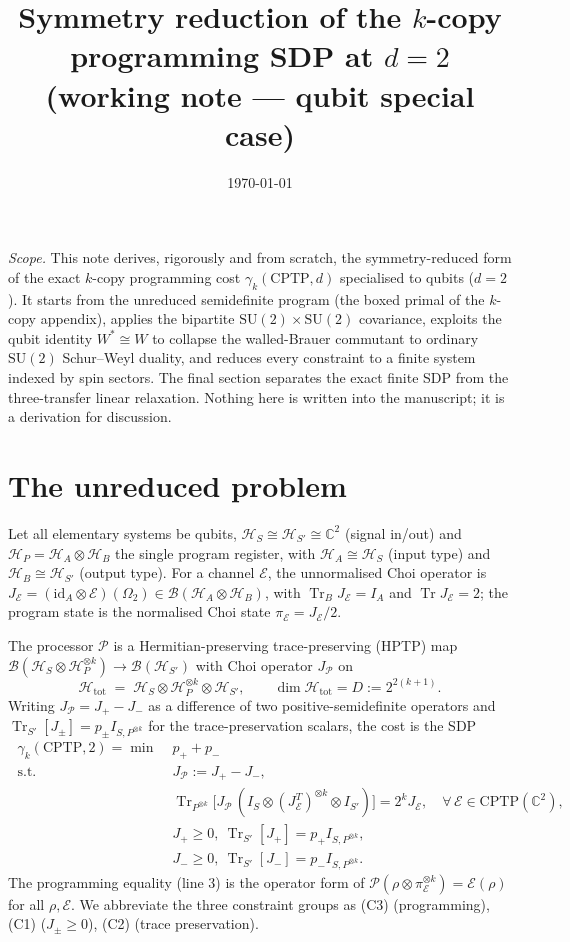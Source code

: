 \documentclass[11pt]{article}
\title{\bf Symmetry reduction of the $k$-copy programming SDP at $d=2$\\[2pt]
\large (working note --- qubit special case)}
\author{}
\date{\today}
\newcommand{\Tr}{\operatorname{Tr}}
\newcommand{\id}{\mathrm{id}}
\newcommand{\CC}{\mathbb{C}}
\newcommand{\HH}{\mathcal{H}}
\newcommand{\BB}{\mathcal{B}}
\newcommand{\cP}{\mathcal{P}}
\newcommand{\cE}{\mathcal{E}}
\newcommand{\SU}{\mathrm{SU}}
\newcommand{\CPTP}{\mathrm{CPTP}}
\newcommand{\ox}{\otimes}
\begin{document}
\maketitle
\vspace{-2.2em}

\noindent\emph{Scope.} This note derives, rigorously and from scratch, the symmetry-reduced
form of the exact $k$-copy programming cost $\gamma_k(\CPTP,d)$ specialised to qubits
($d=2$). It starts from the unreduced semidefinite program (the boxed primal of the
$k$-copy appendix), applies the bipartite $\SU(2)\times\SU(2)$ covariance, exploits the
qubit identity $W^\ast\cong W$ to collapse the walled-Brauer commutant to ordinary
$\SU(2)$ Schur--Weyl duality, and reduces every constraint to a finite system indexed by
spin sectors. The final section separates the exact finite SDP from the three-transfer
linear relaxation. Nothing here is written into the manuscript; it is a derivation for
discussion.

\section{The unreduced problem}
Let all elementary systems be qubits, $\HH_S\cong\HH_{S'}\cong\CC^2$ (signal in/out) and
$\HH_P=\HH_A\ox\HH_B$ the single program register, with $\HH_A\cong\HH_S$ (input type) and
$\HH_B\cong\HH_{S'}$ (output type). For a channel $\cE$, the unnormalised Choi operator is
$J_\cE=(\id_A\ox\cE)(\Omega_2)\in\BB(\HH_A\ox\HH_B)$, with $\Tr_B J_\cE=I_A$ and
$\Tr J_\cE=2$; the program state is the normalised Choi state $\pi_\cE=J_\cE/2$.

The processor $\cP$ is a Hermitian-preserving trace-preserving (HPTP) map
$\BB(\HH_S\ox\HH_P^{\ox k})\to\BB(\HH_{S'})$ with Choi operator $J_\cP$ on
\begin{equation}
\HH_{\mathrm{tot}}\;=\;\HH_S\ox\HH_P^{\ox k}\ox\HH_{S'},\qquad
\dim\HH_{\mathrm{tot}}=D:=2^{2(k+1)} .
\end{equation}
Writing $J_\cP=J_+-J_-$ as a difference of two positive-semidefinite operators and
$\Tr_{S'}[J_\pm]=p_\pm I_{S,P^{\ox k}}$ for the trace-preservation scalars, the cost is the
SDP
\begin{equation}\label{eq:sdp}
\boxed{\;
\begin{aligned}
\gamma_k(\CPTP,2)=\min\;& p_++p_- \\
\text{s.t. }& J_\cP:=J_+-J_-,\\
&\Tr_{P^{\ox k}}\!\big[J_\cP\,(I_S\ox(J_\cE^{T})^{\ox k}\ox I_{S'})\big]=2^{k}J_\cE,
   \quad\forall\,\cE\in\CPTP(\CC^2),\\
&J_+\ge0,\ \Tr_{S'}[J_+]=p_+I_{S,P^{\ox k}},\\
&J_-\ge0,\ \Tr_{S'}[J_-]=p_-I_{S,P^{\ox k}} .
\end{aligned}\;}
\end{equation}
The programming equality (line 3) is the operator form of
$\cP(\rho\ox\pi_\cE^{\ox k})=\cE(\rho)$ for all $\rho,\cE$. We abbreviate the three
constraint groups as (C3) (programming), (C1) ($J_\pm\ge0$), (C2) (trace preservation).
\end{document}
